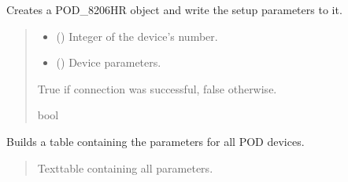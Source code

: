 \documentclass[letterpaper,10pt,english]{sphinxmanual}
\begin{document}
\begin{fulllineitems}
\begin{fulllineitems}
\end{fulllineitems}


\begin{fulllineitems}
\label{\detokenize{Setup_8480SC:Setup_8480SC.Setup_8480SC._ConnectPODdevice}}
\pysigstartsignatures
{}
\pysigstopsignatures
\sphinxAtStartPar
Creates a POD\_8206HR object and write the setup parameters to it.
\begin{quote}\begin{description}
\begin{itemize}
\item {} 
\sphinxAtStartPar
{} () \textendash{} Integer of the device’s number.

\item {} 
\sphinxAtStartPar
{} ({\hyperref[\detokenize{Setup_PodParameters:Setup_PodParameters.Params_8480SC}]{}}) \textendash{} Device parameters.

\end{itemize}

\sphinxAtStartPar
True if connection was successful, false otherwise.

\sphinxAtStartPar
bool

\end{description}\end{quote}

\end{fulllineitems}


\begin{fulllineitems}
\label{\detokenize{Setup_8480SC:Setup_8480SC.Setup_8480SC._GetPODdeviceParameterTable}}
\pysigstartsignatures
{}
\pysigstopsignatures
\sphinxAtStartPar
Builds a table containing the parameters for all POD devices.
\begin{quote}\begin{description}
\sphinxAtStartPar
Texttable containing all parameters.


\end{description}
\end{quote}
\end{fulllineitems}
\end{fulllineitems}
\end{document}
